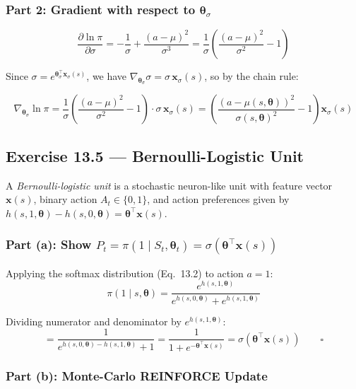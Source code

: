 \documentclass{article}
\begin{document}
\subsubsection*{Part 2: Gradient with respect to $\boldsymbol{\theta}_\sigma$}

\[
\frac{\partial \ln\pi}{\partial \sigma}
= -\frac{1}{\sigma} + \frac{(a-\mu)^2}{\sigma^3}
= \frac{1}{\sigma}\left(\frac{(a-\mu)^2}{\sigma^2} - 1\right)
\]

Since $\sigma = e^{\boldsymbol{\theta}_\sigma^\top \mathbf{x}_\sigma(s)}$, we have $\nabla_{\boldsymbol{\theta}_\sigma}\sigma = \sigma\,\mathbf{x}_\sigma(s)$, so by the chain rule:

\[
\nabla_{\boldsymbol{\theta}_\sigma} \ln\pi
= \frac{1}{\sigma}\left(\frac{(a-\mu)^2}{\sigma^2} - 1\right) \cdot \sigma\,\mathbf{x}_\sigma(s)
= \left(\frac{(a - \mu(s,\boldsymbol{\theta}))^2}{\sigma(s,\boldsymbol{\theta})^2} - 1\right)\mathbf{x}_\sigma(s)
\]
\subsection*{Exercise 13.5 --- Bernoulli-Logistic Unit}

A \textit{Bernoulli-logistic unit} is a stochastic neuron-like unit with feature vector
$\mathbf{x}(s)$, binary action $A_t \in \{0, 1\}$, and action preferences given by
$h(s, 1, \boldsymbol{\theta}) - h(s, 0, \boldsymbol{\theta}) = \boldsymbol{\theta}^\top \mathbf{x}(s)$.

\subsubsection*{Part (a): Show $P_t = \pi(1 \mid S_t, \boldsymbol{\theta}_t) = \sigma(\boldsymbol{\theta}^\top \mathbf{x}(s))$}

Applying the softmax distribution (Eq.\ 13.2) to action $a = 1$:
\[
\pi(1 \mid s, \boldsymbol{\theta})
= \frac{e^{h(s,1,\boldsymbol{\theta})}}{e^{h(s,0,\boldsymbol{\theta})} + e^{h(s,1,\boldsymbol{\theta})}}
\]

Dividing numerator and denominator by $e^{h(s,1,\boldsymbol{\theta})}$:
\[
= \frac{1}{e^{h(s,0,\boldsymbol{\theta}) - h(s,1,\boldsymbol{\theta})} + 1}
= \frac{1}{1 + e^{-\boldsymbol{\theta}^\top \mathbf{x}(s)}}
= \sigma\!\left(\boldsymbol{\theta}^\top \mathbf{x}(s)\right) \qquad \square
\]

\subsubsection*{Part (b): Monte-Carlo REINFORCE Update}
\end{document}
